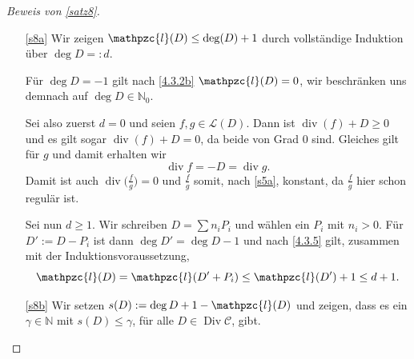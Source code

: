\documentclass[a4paper,12pt,index=toc]{scrbook}
\theoremstyle{keinenummern} %
\def\CC{\mathcal{C}}
\renewcommand{\L}{\mathcal{L}}
\def\ll{\mathpzc{l}}
\newcommand{\Div}{\operatorname{Div}}
\renewcommand{\div}{\operatorname{div}}
\newcommand{\set}[1]{\ensuremath{\mathbb{#1}}}
\newcommand{\N}{\set{N}}
\begin{document}
\begin{proof}[Beweis von \cref{satz8}]
\begin{enumerate}
\item[\ref{s8a}] Wir zeigen $\ll(D)\leq \deg(D)+1$ durch vollständige Induktion über $\deg D=:d$.

Für $\deg D=-1$ gilt nach \cref{4.3.2b} $\ll(D)=0$, wir beschränken uns demnach auf $\deg D\in\N_{0}$.

Sei also zuerst $d=0$ und seien $f,g\in\L(D)$. Dann ist $\div(f)+D\geq 0$ und es gilt sogar $\div(f)+D=0$, da beide von Grad $0$ sind. Gleiches gilt für $g$ und damit erhalten wir
\begin{equation*}\div f=-D=\div g.\end{equation*}
Damit ist auch $\div\bigl(\frac{f}{g}\bigr)=0$ und $\frac{f}{g}$ somit, nach \cref{s5a}, konstant, da $\frac{f}{g}$ hier schon regulär ist.

Sei nun $d\geq 1$. Wir schreiben $D=\sum n_{i}P_{i}$ und wählen ein $P_{i}$ mit $n_{i}>0$. Für $D':=D-P_{i}$ ist dann $\deg D'=\deg D-1$ und nach \cref{4.3.5} gilt, zusammen mit der Induktionsvoraussetzung,
\begin{equation*}\ll(D)=\ll(D'+P_{i})\leq\ll(D')+1\leq d+1.\end{equation*}
\item[\ref{s8b}] Wir setzen $s(D):=\deg D+1-\ll(D)$ und zeigen, dass es ein $\gamma\in\N$ mit $s(D)\leq\gamma$, für alle $D\in\Div\CC$, gibt.


\end{enumerate}
\end{proof}
\end{document}
